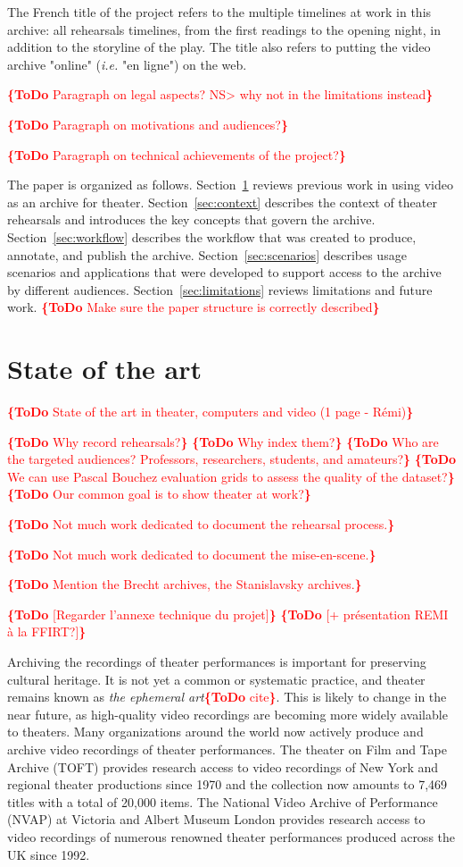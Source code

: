 \documentclass[conference]{IEEEtran}
\newcommand{\todo}[1]{\noindent\textcolor{red}{{\bf \{ToDo} #1{\bf \}}}}
\begin{document}
The French title of the project refers to the multiple timelines at work in this archive: all rehearsals timelines, from the first readings to the opening night, in addition to the storyline of the play. The title also refers to putting the video archive "online" ({\it i.e.} "en ligne") on the web.

\todo{Paragraph on legal aspects? NS> why not in the limitations instead} 

\todo{Paragraph on motivations and audiences?}

\todo{Paragraph on technical achievements of the project?}

The paper is organized as follows. Section~\ref{sec:stateoftheart} reviews previous work in using video as an archive for theater. Section~\ref{sec:context} describes
the context of theater rehearsals and introduces the key concepts that govern the archive. Section~\ref{sec:workflow} describes the workflow that was
created to produce, annotate, and publish the archive. Section~\ref{sec:scenarios} describes usage scenarios and applications that were developed
to support access to the archive by different audiences. Section~\ref{sec:limitations} reviews limitations and future work.
\todo{Make sure the paper structure is correctly described}


\section{State of the art}
\label{sec:stateoftheart}
\todo{State of the art in theater, computers and video (1 page - Rémi)}

\todo{Why record rehearsals?}
\todo{Why index them?}
\todo{Who are the targeted audiences? Professors, researchers, students, and amateurs?}
\todo{We can use Pascal Bouchez evaluation grids to assess the quality of the dataset?}
\todo{Our common goal is to show theater at work?}

\todo{Not much work dedicated to document the rehearsal process.}

\todo{Not much work dedicated to document the mise-en-scene.}

\todo{Mention the Brecht archives, the Stanislavsky archives.}

\todo{[Regarder l'annexe technique du projet]}
\todo{[+ présentation REMI à la FFIRT?]}

Archiving the recordings of theater performances is important for preserving  cultural heritage. 
It is not yet a common or systematic practice, and theater remains known as {\em the ephemeral art}\todo{cite}.
This is likely to change in the near future, as high-quality video recordings are becoming more widely
available to theaters.   Many organizations around the world now actively produce and
archive video recordings of theater performances. The theater on Film and Tape Archive
(TOFT) provides research access to video recordings of New York and regional theater productions
since 1970 and the collection now amounts to 7,469 titles with a total of 20,000 items. 
The National Video Archive of Performance (NVAP) at Victoria and Albert Museum London
provides research access to video recordings of numerous renowned theater performances produced
across the UK since 1992. 
\end{document}
